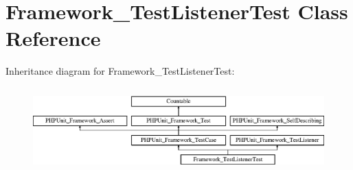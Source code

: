 \hypertarget{class_framework___test_listener_test}{}\section{Framework\+\_\+\+Test\+Listener\+Test Class Reference}
\label{class_framework___test_listener_test}
Inheritance diagram for Framework\+\_\+\+Test\+Listener\+Test\+:\begin{figure}[H]
\begin{center}
\leavevmode
\includegraphics[height=3.303835cm]{class_framework___test_listener_test}
\end{center}
\end{figure}
